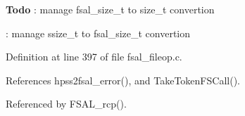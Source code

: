 \begin{Desc}
\item[{\bf Todo}]: manage fsal\_\-size\_\-t to size\_\-t convertion 

: manage ssize\_\-t to fsal\_\-size\_\-t convertion\end{Desc}


Definition at line 397 of file fsal\_\-fileop.c.

References hpss2fsal\_\-error(), and Take\-Token\-FSCall().

Referenced by FSAL\_\-rcp().